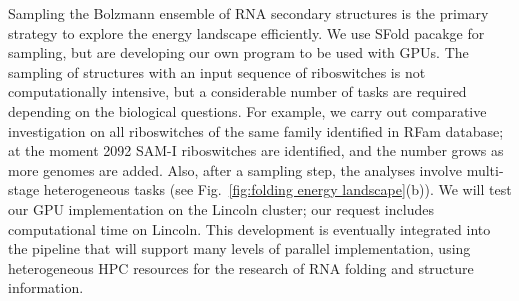 \documentclass[a4paper,10pt]{article}
\begin{document}
Sampling the Bolzmann ensemble of RNA secondary structures is the primary strategy to explore the energy landscape efficiently.  We use SFold pacakge\cite{ding2006} for sampling, but are developing our own program to be used with GPUs. The sampling of structures with an input sequence of riboswitches is not computationally intensive, but a considerable number of tasks are required depending on the biological questions.  For example, we carry out comparative investigation on all riboswitches of the same family identified in RFam database; at the moment 2092 SAM-I riboswitches are identified, and the number grows as more genomes are added.  Also, after a sampling step, the analyses involve multi-stage heterogeneous tasks (see Fig.~\ref{fig:folding energy landscape}(b)).  
We will test our GPU implementation on the Lincoln cluster; our request includes computational time on Lincoln. This development is eventually integrated into the pipeline that will support many levels of parallel implementation, using heterogeneous HPC resources for the research of RNA folding and structure information.










\end{document}
